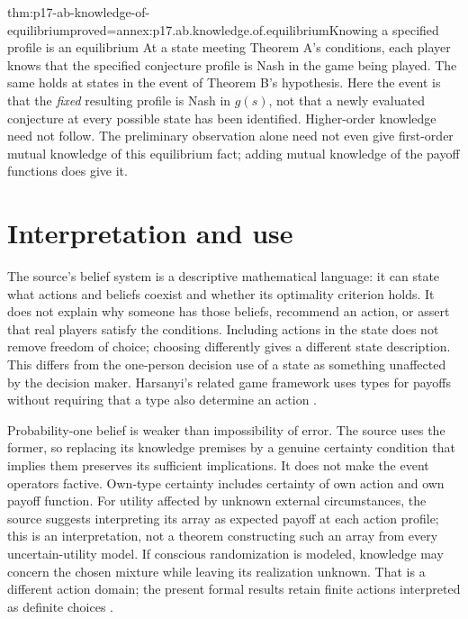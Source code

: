 \begin{hbtheorem}{thm:p17-ab-knowledge-of-equilibrium}{proved=annex:p17.ab.knowledge.of.equilibrium}{Knowing a specified profile is an equilibrium}
At a state meeting Theorem A's conditions, each player knows that
the specified conjecture profile is Nash in the game being played.
The same holds at states in the event of Theorem B's hypothesis.
Here the event is that the \emph{fixed} resulting profile is Nash
in \(g(s)\), not that a newly evaluated conjecture at every possible
state has been identified. Higher-order knowledge need not follow.
The preliminary observation alone need not even give first-order
mutual knowledge of this equilibrium fact; adding mutual knowledge
of the payoff functions does give it.
\end{hbtheorem}

\section{Interpretation and use}

The source's belief system is a descriptive mathematical language:
it can state what actions and beliefs coexist and whether its optimality
criterion holds. It does not explain why someone has those beliefs,
recommend an action, or assert that real players satisfy the conditions.
Including actions in the state does not remove freedom of choice;
choosing differently gives a different state description. This differs
from the one-person decision use of a state as something unaffected by
the decision maker. Harsanyi's related game framework uses types for
payoffs without requiring that a type also determine an action
\parencite[pp.~1174--1175]{AumannBrandenburger1995Epistemic}.

Probability-one belief is weaker than impossibility of error. The source
uses the former, so replacing its knowledge premises by a genuine
certainty condition that implies them preserves its sufficient
implications. It does not make the event operators factive. Own-type
certainty includes certainty of own action and own payoff function.
For utility affected by unknown external circumstances, the source
suggests interpreting its array as expected payoff at each action
profile; this is an interpretation, not a theorem constructing such
an array from every uncertain-utility model. If conscious randomization
is modeled, knowledge may concern the chosen mixture while leaving
its realization unknown. That is a different action domain; the present
formal results retain finite actions interpreted as definite choices
\parencite[pp.~1175--1176]{AumannBrandenburger1995Epistemic}.


